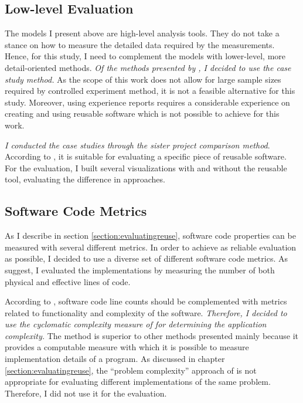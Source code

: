 \subsection{Low-level Evaluation}

The models I present above are high-level analysis tools. They do not take a stance on how to measure the detailed data required by the measurements. Hence, for this study, I need to complement the models with lower-level, more detail-oriented methods. \emph{Of the methods presented by \citet{mohagheghi_quality_2007}, I decided to use the case study method.} As the scope of this work does not allow for large sample sizes required by controlled experiment method, it is not a feasible alternative for this study. Moreover, using experience reports requires a considerable experience on creating and using reusable software which is not possible to achieve for this work.

\emph{I conducted the case studies through the sister project comparison method}. According to \citet{mohagheghi_quality_2007}, it is suitable for evaluating a specific piece of reusable software. For the evaluation, I built several visualizations with and without the reusable tool, evaluating the difference in approaches.

\subsection{Software Code Metrics}

As I describe in section \ref{section:evaluatingreuse}, software code properties can be measured with several different metrics. In order to achieve as reliable evaluation as possible, I decided to use a diverse set of different software code metrics. As \citet{fenton_software_1998} suggest, I evaluated the implementations by measuring the number of both physical and effective lines of code.

According to \citet{fenton_software_1998}, software code line counts should be complemented with metrics related to functionality and complexity of the software. \emph{Therefore, I decided to use the cyclomatic complexity measure of \citet{mccabe_complexity_1976} for determining the application complexity.} The method is superior to other methods presented mainly because it provides a computable measure with which it is possible to measure implementation details of a program. As discussed in chapter \ref{section:evaluatingreuse}, the ``problem complexity'' approach of \citet{fenton_software_1998} is not appropriate for evaluating different implementations of the same problem. Therefore, I did not use it for the evaluation.

